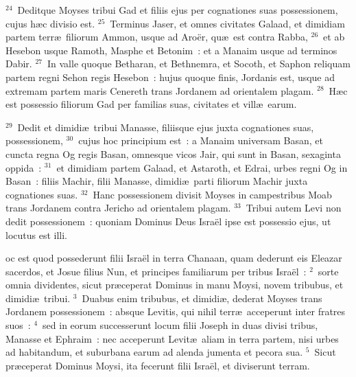 ${}^{24}$~Deditque Moyses tribui Gad et filiis ejus per cognationes suas possessionem, cujus h\ae c divisio est.
${}^{25}$~Terminus Jaser, et omnes civitates Galaad, et dimidiam partem terr\ae\ filiorum Ammon, usque ad Aro\"er, qu\ae\ est contra Rabba,
${}^{26}$~et ab Hesebon usque Ramoth, Masphe et Betonim~: et a Manaim usque ad terminos Dabir.
${}^{27}$~In valle quoque Betharan, et Bethnemra, et Socoth, et Saphon reliquam partem regni Sehon regis Hesebon~: hujus quoque finis, Jordanis est, usque ad extremam partem maris Cenereth trans Jordanem ad orientalem plagam.
${}^{28}$~H\ae c est possessio filiorum Gad per familias suas, civitates et vill\ae\ earum.


${}^{29}$~Dedit et dimidi\ae\ tribui Manasse, filiisque ejus juxta cognationes suas, possessionem,
${}^{30}$~cujus hoc principium est~: a Manaim universam Basan, et cuncta regna Og regis Basan, omnesque vicos Jair, qui sunt in Basan, sexaginta oppida~:
${}^{31}$~et dimidiam partem Galaad, et Astaroth, et Edrai, urbes regni Og in Basan~: filiis Machir, filii Manasse, dimidi\ae\ parti filiorum Machir juxta cognationes suas.
${}^{32}$~Hanc possessionem divisit Moyses in campestribus Moab trans Jordanem contra Jericho ad orientalem plagam.
${}^{33}$~Tribui autem Levi non dedit possessionem~: quoniam Dominus Deus Isra\"el ipse est possessio ejus, ut locutus est illi.

\bchapter
{}oc est quod possederunt filii Isra\"el in terra Chanaan, quam dederunt eis Eleazar sacerdos, et Josue filius Nun, et principes familiarum per tribus Isra\"el~:
${}^{2}$~sorte omnia dividentes, sicut pr\ae ceperat Dominus in manu Moysi, novem tribubus, et dimidi\ae\ tribui.
${}^{3}$~Duabus enim tribubus, et dimidi\ae , dederat Moyses trans Jordanem possessionem~: absque Levitis, qui nihil terr\ae\ acceperunt inter fratres suos~:
${}^{4}$~sed in eorum successerunt locum filii Joseph in duas divisi tribus, Manasse et Ephraim~: nec acceperunt Levit\ae\ aliam in terra partem, nisi urbes ad habitandum, et suburbana earum ad alenda jumenta et pecora sua.
${}^{5}$~Sicut pr\ae ceperat Dominus Moysi, ita fecerunt filii Isra\"el, et diviserunt terram.


